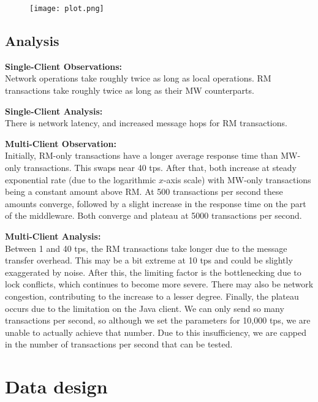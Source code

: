 \documentclass[11pt]{article}
\begin{document}
\begin{figure}[H]
\centering
\texttt{[image: plot.png]}
\end{figure}

\subsection*{Analysis}

\textbf{Single-Client Observations:} \\
Network operations take roughly twice as long as local operations. RM transactions take roughly twice as long as their MW counterparts.\par

\textbf{Single-Client Analysis:} \\
There is network latency, and increased message hops for RM transactions. \par

\textbf{Multi-Client Observation:}\\
Initially, RM-only transactions have a longer average response time than MW-only transactions. This swaps near 40 tps. After that, both increase at steady exponential rate (due to the logarithmic $x$-axis scale) with MW-only transactions being a constant amount above RM. At 500 transactions per second these amounts converge, followed by a slight increase in the response time on the part of the middleware. Both converge and plateau at 5000 transactions per second. \par

\textbf{Multi-Client Analysis:}\\
Between 1 and 40 tps, the RM transactions take longer due to the message transfer overhead. This may be a bit extreme at 10 tps and could be slightly exaggerated by noise. After this, the limiting factor is the bottlenecking due to lock conflicts, which continues to become more severe. There may also be network congestion, contributing to the increase to a lesser degree. Finally, the plateau occurs due to the limitation on the Java client. We can only send so many transactions per second, so although we set the parameters for 10,000 tps, we are unable to actually achieve that number. Due to this insufficiency, we are capped in the number of transactions per second that can be tested.

\section*{Data design}
\end{document}
